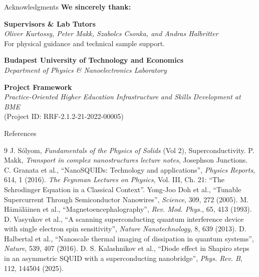 \documentclass[aspectratio=169]{beamer}
\begin{document}
\begin{frame}{Acknowledgments}
    \centering
    \large
    \textbf{We sincerely thank:}
    
    \vspace{0.8cm}
    
    \textbf{Supervisors \& Lab Tutors} \\
    \textit{Oliver Kurtossy, Peter Makk, Szabolcs Csonka, and Andras Halbritter} \\
    For physical guidance and technical sample support.
    
    \vspace{0.5cm}
    
    \textbf{Budapest University of Technology and Economics} \\
    \textit{Department of Physics \& Nanoelectronics Laboratory}
    
    \vspace{0.5cm}
    
    \textbf{Project Framework} \\
    \textit{Practice-Oriented Higher Education Infrastructure and Skills Development at BME} \\
    (Project ID: RRF-2.1.2-21-2022-00005)
\end{frame}

\begin{frame}{References}
    \footnotesize
    \begin{thebibliography}{9}
         J. S{\'o}lyom, \textit{Fundamentals of the Physics of Solids} (Vol 2), Superconductivity.
         P. Makk, \textit{Transport in complex nanostructures lecture notes}, Josephson Junctions.
         C. Granata et al., ``NanoSQUIDs: Technology and applications'', \textit{Physics Reports}, 614, 1 (2016).
         \textit{The Feynman Lectures on Physics}, Vol. III, Ch. 21: ``The Schrodinger Equation in a Classical Context''.
         Yong-Joo Doh et al., ``Tunable Supercurrent Through Semiconductor Nanowires'', \textit{Science}, 309, 272 (2005).
         M. H{\"a}m{\"a}l{\"a}inen et al., ``Magnetoencephalography'', \textit{Rev. Mod. Phys.}, 65, 413 (1993).
         D. Vasyukov et al., ``A scanning superconducting quantum interference device with single electron spin sensitivity'', \textit{Nature Nanotechnology}, 8, 639 (2013).
         D. Halbertal et al., ``Nanoscale thermal imaging of dissipation in quantum systems'', \textit{Nature}, 539, 407 (2016).
         D. S. Kalashnikov et al., ``Diode effect in Shapiro steps in an asymmetric SQUID with a superconducting nanobridge'', \textit{Phys. Rev. B}, 112, 144504 (2025).
    \end{thebibliography}
\end{frame}
\end{document}
